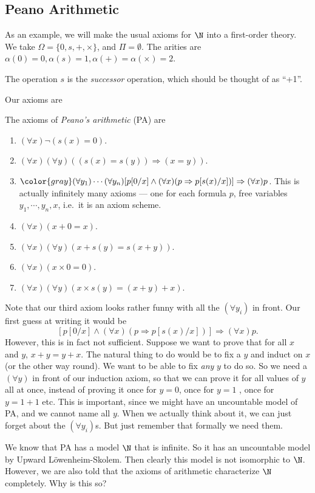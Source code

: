 \documentclass[a4paper]{article}
\begin{document}
\subsection{Peano Arithmetic}
As an example, we will make the usual axioms for $\N$ into a first-order theory. We take $\Omega = \{0, s, +, \times\}$, and $\Pi = \emptyset$. The arities are $\alpha(0) = 0, \alpha(s) = 1, \alpha(+) = \alpha(\times) = 2$.

The operation $s$ is the \emph{successor} operation, which should be thought of as ``+1''.

Our axioms are
\begin{defi}
  The axioms of \emph{Peano's arithmetic} (PA) are
  \begin{enumerate}
    \item $(\forall x)\neg(s(x) = 0)$.
    \item $(\forall x)(\forall y)((s(x) = s(y)) \Rightarrow (x = y))$.
    \item ${\color{gray}(\forall y_1)\cdots (\forall y_n)}[p[0/x] \wedge (\forall x)(p \Rightarrow p[s(x)/x])]\Rightarrow (\forall x)p$. This is actually infinitely many axioms --- one for each formula $p$, free variables $y_1, \cdots, y_n, x$, i.e.\ it is an axiom scheme.
    \item $(\forall x)(x + 0 = x)$.
    \item $(\forall x)(\forall y)(x + s(y) = s(x + y))$.
    \item $(\forall x)(x \times 0 = 0)$.
    \item $(\forall x)(\forall y)(x\times s(y) = (x + y) + x)$.
  \end{enumerate}
  Note that our third axiom looks rather funny with all the $(\forall y_i)$ in front. Our first guess at writing it would be
  \[
    [p[0/x] \wedge (\forall x)(p\Rightarrow p[s(x)/x])] \Rightarrow (\forall x)p.
  \]
  However, this is in fact not sufficient. Suppose we want to prove that for all $x$ and $y$, $x + y = y + x$. The natural thing to do would be to fix a $y$ and induct on $x$ (or the other way round). We want to be able to fix \emph{any} $y$ to do so. So we need a $(\forall y)$ in front of our induction axiom, so that we can prove it for all values of $y$ all at once, instead of proving it once for $y = 0$, once for $y = 1$ , once for $y = 1 + 1$ etc. This is important, since we might have an uncountable model of PA, and we cannot name all $y$. When we actually think about it, we can just forget about the $(\forall y_i)$s. But just remember that formally we need them.
\end{defi}
We know that PA has a model $\N$ that is infinite. So it has an uncountable model by Upward L\"owenheim-Skolem. Then clearly this model is not isomorphic to $\N$. However, we are also told that the axioms of arithmetic characterize $\N$ completely. Why is this so?
\end{document}
